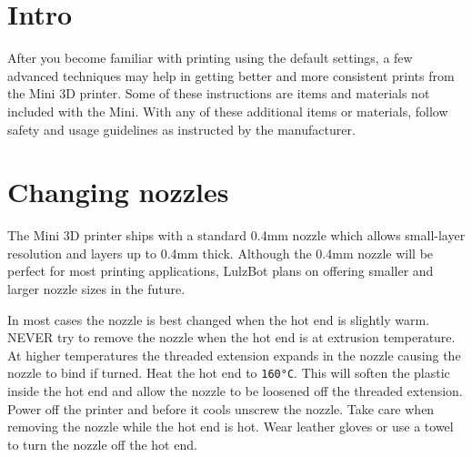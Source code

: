 %
%
%
%
%
%

\section{Intro}
After you become familiar with printing using the default settings, a few advanced techniques may help in getting better and more consistent prints from the Mini 3D printer. Some of these instructions are items and materials not included with the Mini. With any of these additional items or materials, follow safety and usage guidelines as instructed by the manufacturer.

\section{Changing nozzles}
The Mini 3D printer ships with a standard 0.4mm nozzle which allows small-layer resolution and layers up to 0.4mm thick. Although the 0.4mm nozzle will be perfect for most printing applications, LulzBot plans on offering smaller and larger nozzle sizes in the future.

In most cases the nozzle is best changed when the hot end is slightly warm. NEVER try to remove the nozzle when the hot end is at extrusion temperature. At higher temperatures the threaded extension expands in the nozzle causing the nozzle to bind if turned. Heat the hot end to \texttt{160°C}. This will soften the plastic inside the hot end and allow the nozzle to be loosened off the threaded extension. Power off the printer and before it cools unscrew the nozzle. Take care when removing the nozzle while the hot end is hot. Wear leather gloves or use a towel to turn the nozzle off the hot end.

